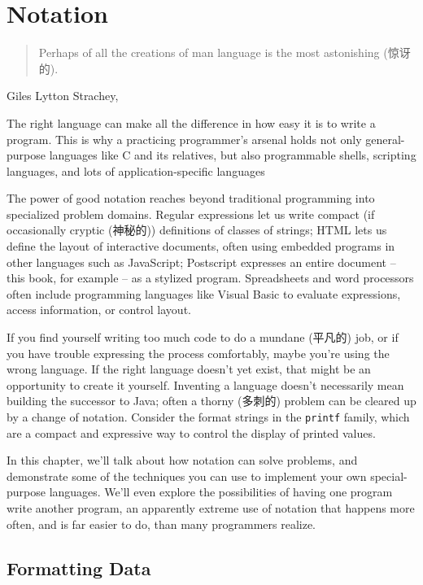 \chapter{Notation}
\label{chap:notation}
\begin{quote}
    Perhaps of all the creations of man language is the most astonishing
    (惊讶的).
\end{quote}
\begin{quotesrc}
    Giles Lytton Strachey, 
\end{quotesrc}

The right language can make all the difference in how easy it is to write a
program. This is why a practicing programmer's arsenal holds not only
general-purpose languages like C and its relatives, but also programmable
shells, scripting languages, and lots of application-specific languages

The power of good notation reaches beyond traditional programming into
specialized problem domains. Regular expressions let us write compact (if
occasionally cryptic (神秘的)) definitions of classes of strings; HTML lets
us define the layout of interactive documents, often using embedded
programs in other languages such as JavaScript; Postscript expresses an
entire document -- this book, for example -- as a stylized program.
Spreadsheets and word processors often include programming languages like
Visual Basic to evaluate expressions, access information, or control
layout.

If you find yourself writing too much code to do a mundane (平凡的) job, or
if you have trouble expressing the process comfortably, maybe you're using
the wrong language. If the right language doesn't yet exist, that might be
an opportunity to create it yourself. Inventing a language doesn't
necessarily mean building the successor to Java; often a thorny (多刺的)
problem can be cleared up by a change of notation. Consider the format
strings in the \verb'printf' family, which are a compact and expressive way
to control the display of printed values.

In this chapter, we'll talk about how notation can solve problems, and
demonstrate some of the techniques you can use to implement your own
special-purpose languages. We'll even explore the possibilities of having
one program write another program, an apparently extreme use of notation
that happens more often, and is far easier to do, than many programmers
realize.

\section{Formatting Data}
\label{sec:formatting_data}

